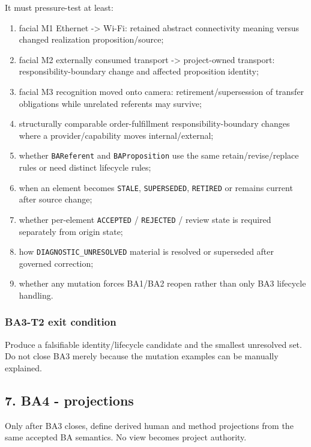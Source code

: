 \documentclass[11pt,a4paper]{article}
\providecommand{\tightlist}{\setlength{\itemsep}{0pt}\setlength{\parskip}{0pt}}
\begin{document}
It must pressure-test at least:

\begin{enumerate}
\def\labelenumi{\arabic{enumi}.}
\tightlist
\item
  facial M1 Ethernet -\textgreater{} Wi-Fi: retained abstract connectivity meaning versus changed realization proposition/source;
\item
  facial M2 externally consumed transport -\textgreater{} project-owned transport: responsibility-boundary change and affected proposition identity;
\item
  facial M3 recognition moved onto camera: retirement/supersession of transfer obligations while unrelated referents may survive;
\item
  structurally comparable order-fulfillment responsibility-boundary changes where a provider/capability moves internal/external;
\item
  whether \texttt{BAReferent} and \texttt{BAProposition} use the same retain/revise/replace rules or need distinct lifecycle rules;
\item
  when an element becomes \texttt{STALE}, \texttt{SUPERSEDED}, \texttt{RETIRED} or remains current after source change;
\item
  whether per-element \texttt{ACCEPTED} / \texttt{REJECTED} / review state is required separately from origin state;
\item
  how \texttt{DIAGNOSTIC\_UNRESOLVED} material is resolved or superseded after governed correction;
\item
  whether any mutation forces BA1/BA2 reopen rather than only BA3 lifecycle handling.
\end{enumerate}

\subsubsection{BA3-T2 exit condition}\label{ba3-t2-exit-condition}

Produce a falsifiable identity/lifecycle candidate and the smallest unresolved set. Do not close BA3 merely because the mutation examples can be manually explained.

\subsection{7. BA4 - projections}\label{7-ba4---projections}

Only after BA3 closes, define derived human and method projections from the same accepted BA semantics. No view becomes project authority.
\end{document}
